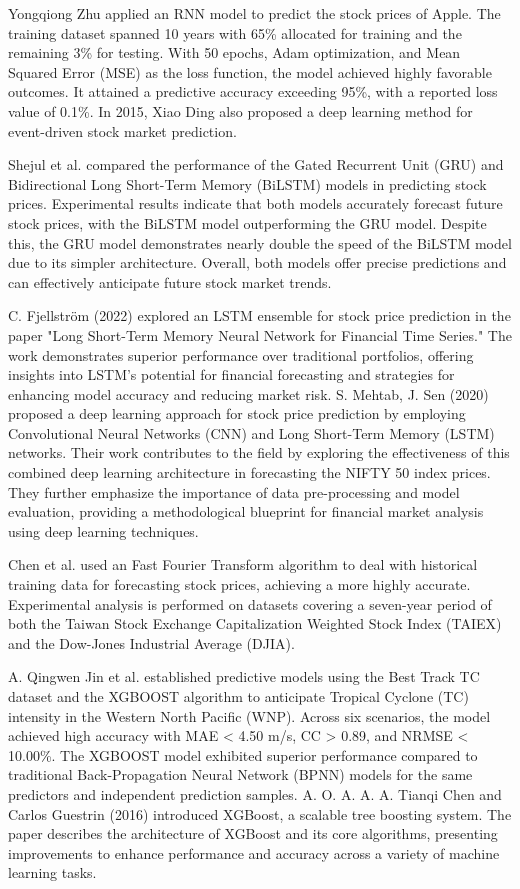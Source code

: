 \documentclass{ieeeojies}
\begin{document}
Yongqiong Zhu \cite{ZhuRNN} applied an RNN model to predict the stock prices of Apple. The training dataset spanned 10 years with 65\% allocated for training and the remaining 3\% for testing. With 50 epochs, Adam optimization, and Mean Squared Error (MSE) as the loss function, the model achieved highly favorable outcomes. It attained a predictive accuracy exceeding 95\%, with a reported loss value of 0.1\%. In 2015, Xiao Ding \cite{DingGRU} also proposed a deep learning method for event-driven stock market prediction.

Shejul et al. \cite{ShejulGRU} compared the performance of the Gated Recurrent Unit (GRU) and Bidirectional Long Short-Term Memory (BiLSTM) models in predicting stock prices. Experimental results indicate that both models accurately forecast future stock prices, with the BiLSTM model outperforming the GRU model. Despite this, the GRU model demonstrates nearly double the speed of the BiLSTM model due to its simpler architecture. Overall, both models offer precise predictions and can effectively anticipate future stock market trends.

C. Fjellström (2022) \cite{fjellstrom2022lstm} explored an LSTM ensemble for stock price prediction in the paper "Long Short-Term Memory Neural Network for Financial Time Series." The work demonstrates superior performance over traditional portfolios, offering insights into LSTM's potential for financial forecasting and strategies for enhancing model accuracy and reducing market risk. S. Mehtab, J. Sen (2020) \cite{mehtab2020stock} proposed a deep learning approach for stock price prediction by employing Convolutional Neural Networks (CNN) and Long Short-Term Memory (LSTM) networks. Their work contributes to the field by exploring the effectiveness of this combined deep learning architecture in forecasting the NIFTY 50 index prices. They further emphasize the importance of data pre-processing and model evaluation, providing a methodological blueprint for financial market analysis using deep learning techniques.

Chen et al.\cite{ChenFFT} used an Fast Fourier Transform algorithm to deal with historical training data for forecasting stock prices, achieving a more highly accurate. Experimental analysis is performed on datasets covering a seven-year period of both the Taiwan Stock Exchange Capitalization Weighted Stock Index (TAIEX) and the Dow-Jones Industrial Average (DJIA). 

A. Qingwen Jin et al. \cite{jin2019using} established predictive models using the Best Track TC dataset and the XGBOOST algorithm to anticipate Tropical Cyclone (TC) intensity in the Western North Pacific (WNP). Across six scenarios, the model achieved high accuracy with MAE < 4.50 m/s, CC > 0.89, and NRMSE < 10.00\%. The XGBOOST model exhibited superior performance compared to traditional Back-Propagation Neural Network (BPNN) models for the same predictors and independent prediction samples. A. O. A. A. A. Tianqi Chen and Carlos Guestrin (2016)\cite{chen2016xgboost} introduced XGBoost, a scalable tree boosting system. The paper describes the architecture of XGBoost and its core algorithms, presenting improvements to enhance performance and accuracy across a variety of machine learning tasks.
\end{document}
